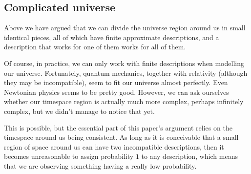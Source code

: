 \documentclass[a4paper
]{article}
\newcommand{\svn}[2][]{\todo[author=Virgil,color=red!25!white,#1]{#2}}
\def\reale{\mathbb{R}}
\newcommand{\ghilimele}[1]{``#1"}
\begin{document}





\subsection{Complicated universe}

Above we have argued that we can divide the universe region around us in small
identical pieces, all of which have finite approximate descriptions, and
a description that works for one of them works for all of them.

Of course, in practice, we can only work with finite descriptions when
modelling our universe.
Fortunately, quantum mechanics, together with
relativity (although they may be incompatible),
seem to fit our universe almost perfectly.
Even Newtonian physics seems to be pretty good.
However, we can ask ourselves whether our timespace
region is actually much more complex, perhaps infinitely complex,
but we didn't manage to notice that yet.

This is possible, but the essential part of this paper's argument relies on
the timespace around us being consistent.
As long as it is conceivable that
a small region of space around us can have two incompatible descriptions,
then it becomes unreasonable to assign probability $1$ to any description, which
means that we are observing something having a really low probability.
\end{document}
